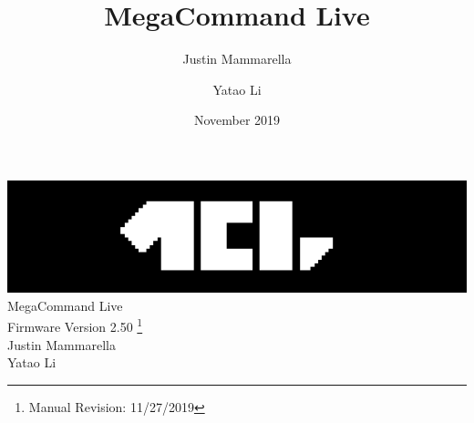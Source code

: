 \documentclass[openany,a4paper,12pt]{book}
\begin{document}
\author{
    Justin Mammarella
    \and
    Yatao Li
}
\title{MegaCommand Live}
\date{November 2019}

\frontmatter
\begin{titlepage}

	\begin{center}
	\vspace*{5.75cm}
	\includegraphics{mcl_logo_black_short.png}
    \vspace*{1.00cm}
	\LARGE
	\vspace*{0.65cm}
	\\MegaCommand Live
    \large
	\\Firmware Version 2.50
	\footnote{Manual Revision: 11/27/2019}
    \vspace*{2cm}
    \\Justin Mammarella
    \\Yatao Li
\end{center}
\end{titlepage}


\tableofcontents

\mainmatter



































\backmatter

\end{document}
